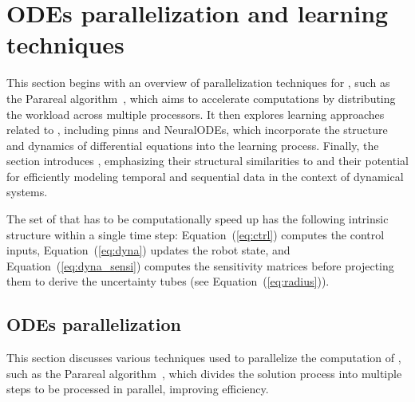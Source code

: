 \section{ODEs parallelization and learning techniques}\label{sec:learning_overview}

This section begins with an overview of parallelization techniques for , such as the Parareal algorithm~\cite{cParareal}, which aims to accelerate computations by distributing the workload across multiple processors. 
It then explores learning approaches related to , including \gls{pinns} and NeuralODEs, which incorporate the structure and dynamics of differential equations into the learning process. 
Finally, the section introduces , emphasizing their structural similarities to  and their potential for efficiently modeling temporal and sequential data in the context of dynamical systems.

The set of  that has to be computationally speed up has the following intrinsic structure within a single time step: Equation~(\ref{eq:ctrl}) computes the control inputs, Equation~(\ref{eq:dyna}) updates the robot state, and Equation~(\ref{eq:dyna_sensi}) computes the sensitivity matrices before projecting them to derive the uncertainty tubes (see Equation~(\ref{eq:radius})). 

\subsection{ODEs parallelization}

This section discusses various techniques used to parallelize the computation of , such as the Parareal algorithm~\cite{cParareal}, which divides the solution process into multiple steps to be processed in parallel, improving efficiency.

